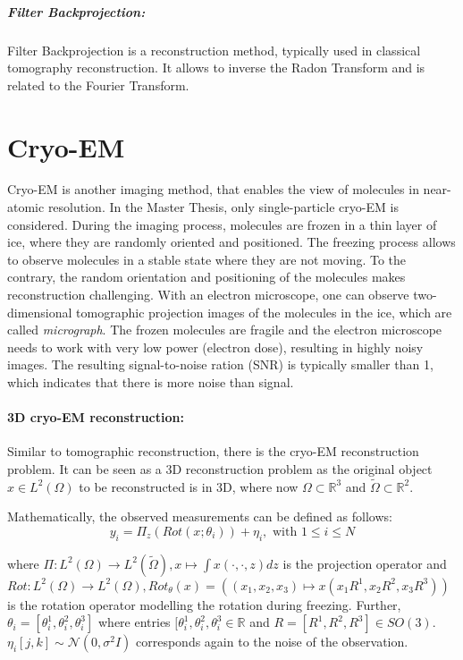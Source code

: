 \subparagraph{Filter Backprojection:}
Filter Backprojection is a reconstruction method, typically used in classical tomography reconstruction.
It allows to inverse the Radon Transform and is related to the Fourier Transform. 

\section{Cryo-EM}
Cryo-EM is another imaging method, that enables the view of molecules in near-atomic resolution.
In the Master Thesis, only single-particle cryo-EM is considered.
During the imaging process, molecules are frozen in a thin layer of ice, where they are randomly oriented and positioned. 
The freezing process allows to observe molecules in a stable state where they are not moving.
To the contrary, the random orientation and positioning of the molecules makes reconstruction challenging\cite{singleParticleCryoEm}.
With an electron microscope, one can observe two-dimensional tomographic projection images of the molecules in the ice,
which are called \textit{micrograph}. The frozen molecules are fragile and the electron microscope needs to work with
very low power (electron dose), resulting in highly noisy images. The resulting signal-to-noise ration (SNR)
is typically smaller than 1, which indicates that there is more noise than signal\cite{cryoEmMath2}.


\paragraph{3D cryo-EM reconstruction:}
Similar to tomographic reconstruction, there is the cryo-EM reconstruction problem\cite{cryoEmMath}.
It can be seen as a 3D reconstruction problem as the original object $x \in L^2(\Omega)$ to be reconstructed is in 3D,
where now $\Omega \subset \mathbb{R}^3 $ and $\tilde{\Omega} \subset \mathbb{R}^2 $.

Mathematically, the observed measurements can be defined as follows:
\begin{equation}
    \label{eg:cryoEmSimple}
    y_i = \Pi_z ( Rot (x; \theta_i)) + \eta_i, \text{ with } 1 \leq i \leq N
\end{equation}

where $\Pi : L^2(\Omega) \to L^2(\tilde{\Omega}), x \mapsto  \int x(\cdot,\cdot,z) dz$ is the projection operator
and $Rot : L^2(\Omega) \to L^2(\Omega), Rot_\theta(x) = \left((x_1,x_2,x_3) \mapsto x( x_1R^1, x_2R^2, x_3R^3)\right)$ is the rotation operator modelling the rotation during freezing.
Further, $\theta_i = [\theta_i^1, \theta_i^2, \theta_i^3 ] $ where entries $ [\theta_i^1, \theta_i^2, \theta_i^3 \in \mathbb{R}$ and 
$R = [R^1, R^2, R^3] \in SO(3)$. $\eta_i[j,k] \sim \mathcal{N}(0,\sigma^2I)$ corresponds again to the noise of the observation.


